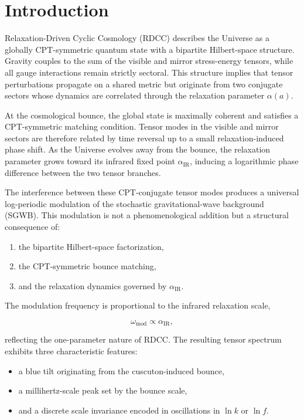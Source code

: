 \documentclass[11pt,a4paper]{article}
\begin{document}
\section{Introduction}

Relaxation-Driven Cyclic Cosmology (RDCC) describes the Universe as a globally
CPT-symmetric quantum state with a bipartite Hilbert-space structure. Gravity couples
to the sum of the visible and mirror stress-energy tensors, while all gauge interactions
remain strictly sectoral. This structure implies that tensor perturbations propagate on a
shared metric but originate from two conjugate sectors whose dynamics are correlated
through the relaxation parameter $\alpha(a)$.

At the cosmological bounce, the global state is maximally coherent and satisfies a
CPT-symmetric matching condition. Tensor modes in the visible and mirror sectors are
therefore related by time reversal up to a small relaxation-induced phase shift. As the
Universe evolves away from the bounce, the relaxation parameter grows toward its
infrared fixed point $\alpha_{\mathrm{IR}}$, inducing a logarithmic phase difference between the
two tensor branches.

The interference between these CPT-conjugate tensor modes produces a universal
log-periodic modulation of the stochastic gravitational-wave background (SGWB). This
modulation is not a phenomenological addition but a structural consequence of:
\begin{enumerate}
    \item the bipartite Hilbert-space factorization,
    \item the CPT-symmetric bounce matching,
    \item and the relaxation dynamics governed by $\alpha_{\mathrm{IR}}$.
\end{enumerate}

The modulation frequency is proportional to the infrared relaxation scale,


\[
    \omega_{\mathrm{mod}} \propto \alpha_{\mathrm{IR}},
\]


reflecting the one-parameter nature of RDCC. The resulting tensor spectrum exhibits
three characteristic features:
\begin{itemize}
    \item a blue tilt originating from the cuscuton-induced bounce,
    \item a millihertz-scale peak set by the bounce scale,
    \item and a discrete scale invariance encoded in oscillations in $\ln k$ or $\ln f$.
\end{itemize}
\end{document}

